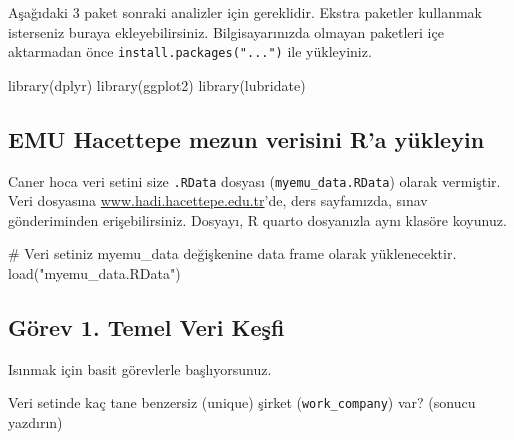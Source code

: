 \documentclass[
  11pt,
  a4paper,
  DIV=11,
  numbers=noendperiod]{scrartcl}
\newenvironment{Shaded}{\begin{snugshade}}{\end{snugshade}}
\newcommand{\CommentTok}[1]{\textcolor[rgb]{0.37,0.37,0.37}{#1}}
\newcommand{\FunctionTok}[1]{\textcolor[rgb]{0.28,0.35,0.67}{#1}}
\newcommand{\NormalTok}[1]{\textcolor[rgb]{0.00,0.23,0.31}{#1}}
\newcommand{\StringTok}[1]{\textcolor[rgb]{0.13,0.47,0.30}{#1}}
\begin{document}
Aşağıdaki 3 paket sonraki analizler için gereklidir. Ekstra paketler
kullanmak isterseniz buraya ekleyebilirsiniz. Bilgisayarınızda olmayan
paketleri içe aktarmadan önce \texttt{install.packages("...")} ile
yükleyiniz.

\begin{Shaded}
\begin{Highlighting}[]
\FunctionTok{library}\NormalTok{(dplyr)}
\FunctionTok{library}\NormalTok{(ggplot2)}
\FunctionTok{library}\NormalTok{(lubridate)}
\end{Highlighting}
\end{Shaded}

\subsection*{EMU Hacettepe mezun verisini R'a
yükleyin}\label{emu-hacettepe-mezun-verisini-ra-yuxfckleyin}

Caner hoca veri setini size \texttt{.RData} dosyası
(\texttt{myemu\_data.RData}) olarak vermiştir. Veri dosyasına
\hyperref[0]{www.hadi.hacettepe.edu.tr}'de, ders sayfamızda, sınav
gönderiminden erişebilirsiniz. Dosyayı, R quarto dosyanızla aynı klasöre
koyunuz.

\begin{Shaded}
\begin{Highlighting}[]
\CommentTok{\# Veri setiniz myemu\_data değişkenine data frame olarak yüklenecektir.}
\FunctionTok{load}\NormalTok{(}\StringTok{"myemu\_data.RData"}\NormalTok{)}
\end{Highlighting}
\end{Shaded}

\subsection{Görev 1. Temel Veri
Keşfi}\label{guxf6rev-1.-temel-veri-keux15ffi}

Isınmak için basit görevlerle başlıyorsunuz.

Veri setinde kaç tane benzersiz (unique) şirket (\texttt{work\_company})
var? (sonucu yazdırın)

\begin{Shaded}
\end{Shaded}
\end{document}
